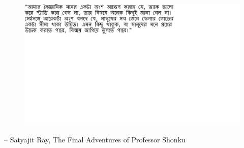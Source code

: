 \thispagestyle{empty}
{}

\vspace*{3cm}

\begin{center}
\begin{figure}
  \centering
  	\vspace{7cm}
    \includegraphics[width=0.9\linewidth]{preamble/quote.pdf} 
\end{figure}
\vspace{-4cm}
 -- Satyajit Ray, The Final Adventures of Professor Shonku 
\end{center}

\medskip
